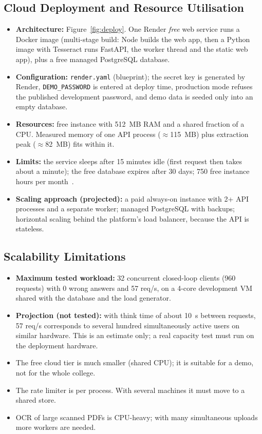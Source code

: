 \subsection{Cloud Deployment and Resource Utilisation}
\begin{itemize}
\item \textbf{Architecture:} Figure~\ref{fig:deploy}. One Render \emph{free} web service runs a Docker
      image (multi-stage build: Node builds the web app, then a Python image with Tesseract runs
      FastAPI, the worker thread and the static web app), plus a free managed PostgreSQL database.
\item \textbf{Configuration:} \texttt{render.yaml} (blueprint); the secret key is generated by Render,
      \texttt{DEMO\_PASSWORD} is entered at deploy time, production mode refuses the published
      development password, and demo data is seeded only into an empty database.
\item \textbf{Resources:} free instance with 512~MB RAM and a shared fraction of a CPU. Measured
      memory of one API process ($\approx$115~MB) plus extraction peak ($\approx$82~MB) fits within it.
\item \textbf{Limits:} the service sleeps after 15 minutes idle (first request then takes about a
      minute); the free database expires after 30 days; 750 free instance hours per month~\cite{render}.
\item \textbf{Scaling approach (projected):} a paid always-on instance with 2+ API processes and a
      separate worker; managed PostgreSQL with backups; horizontal scaling behind the platform's load
      balancer, because the API is stateless.
\end{itemize}

\subsection{Scalability Limitations}
\begin{itemize}
\item \textbf{Maximum tested workload:} 32 concurrent closed-loop clients (960 requests) with 0 wrong
      answers and 57 req/s, on a 4-core development VM shared with the database and the load generator.
\item \textbf{Projection (not tested):} with think time of about 10~s between requests, 57 req/s
      corresponds to several hundred simultaneously active users on similar hardware. This is an
      estimate only; a real capacity test must run on the deployment hardware.
\item The free cloud tier is much smaller (shared CPU); it is suitable for a demo, not for the whole college.
\item The rate limiter is per process. With several machines it must move to a shared store.
\item OCR of large scanned PDFs is CPU-heavy; with many simultaneous uploads more workers are needed.
\end{itemize}

\newpage
